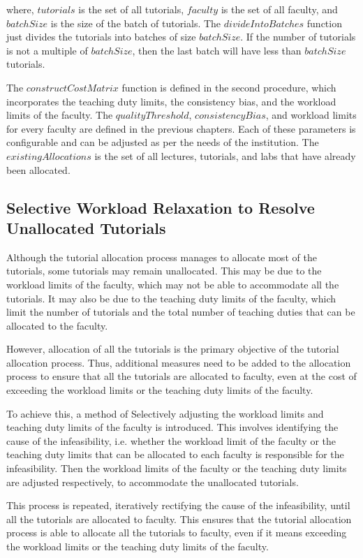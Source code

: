 where, $tutorials$ is the set of all tutorials, $faculty$ is the set of all faculty, and $batchSize$ is the size of the batch of tutorials. The $divideIntoBatches$ function just divides the tutorials into batches of size $batchSize$. If the number of tutorials is not a multiple of $batchSize$, then the last batch will have less than $batchSize$ tutorials.

The $constructCostMatrix$ function is defined in the second procedure, which incorporates the teaching duty limits, the consistency bias, and the workload limits of the faculty. The $qualityThreshold$, $consistencyBias$, and workload limits for every faculty are defined in the previous chapters. Each of these parameters is configurable and can be adjusted as per the needs of the institution. The $existingAllocations$ is the set of all lectures, tutorials, and labs that have already been allocated.


\subsection{Selective Workload Relaxation to Resolve Unallocated Tutorials}

Although the tutorial allocation process manages to allocate most of the tutorials, some tutorials may remain unallocated. This may be due to the workload limits of the faculty, which may not be able to accommodate all the tutorials. It may also be due to the teaching duty limits of the faculty, which limit the number of tutorials and the total number of teaching duties that can be allocated to the faculty.

However, allocation of all the tutorials is the primary objective of the tutorial allocation process. Thus, additional measures need to be added to the allocation process to ensure that all the tutorials are allocated to faculty, even at the cost of exceeding the workload limits or the teaching duty limits of the faculty.

To achieve this, a method of Selectively adjusting the workload limits and teaching duty limits of the faculty is introduced. This involves identifying the cause of the infeasibility, i.e. whether the workload limit of the faculty or the teaching duty limits that can be allocated to each faculty is responsible for the infeasibility. Then the workload limits of the faculty or the teaching duty limits are adjusted respectively, to accommodate the unallocated tutorials.

This process is repeated, iteratively rectifying the cause of the infeasibility, until all the tutorials are allocated to faculty. This ensures that the tutorial allocation process is able to allocate all the tutorials to faculty, even if it means exceeding the workload limits or the teaching duty limits of the faculty.

